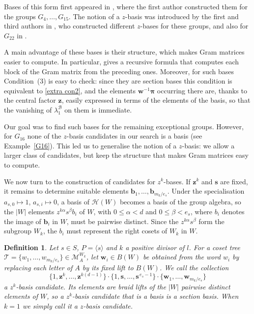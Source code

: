 \documentclass[11pt, reqno]{amsart}
\newcommand{\cB}{\mathcal{B}}
\newcommand{\cH}{\mathcal{H}}
\numberwithin{equation}{section}
\newtheorem{definition}[theorem]{Definition}
\theoremstyle{remark}
\begin{document}
	
	
	

Bases of this form first appeared in \cite{Ch17}, where the first author constructed
them for the groups $G_4,\dots,G_{15}$. The notion of a $z$-basis was introduced by the first and third
authors in \cite[Definition~2.4]{ChPf}, who constructed different $z$-bases for these
groups, and also for $G_{22}$ in
\cite{ChPf1}.

 A main advantage of these bases is their structure, which
	makes Gram matrices easier to compute. In particular,
	\cite[Lemma~3.2]{ChPf} gives a recursive formula that computes each
	block of the Gram matrix from the preceding ones. Moreover, for such bases Condition~(3) is easy to check: since they are section bases this condition is
	equivalent to \eqref{extra con2}, and the elements $\mathbf w^{-1}\boldsymbol\pi$
	occurring there are, thanks to the central factor $\mathbf z$, easily expressed in terms of
	the elements of the basis, so that the vanishing of $\lambda_1^{\cB}$ on them is immediate.
	
	Our goal was to find such bases for the remaining exceptional groups.
	However, for $G_{16}$ none of the $z$-basis candidates in our search
	is a basis (see Example~\ref{G16}). This led us to generalise the
	notion of a $z$-basis: we allow a larger class of candidates, but keep
	the structure that makes Gram matrices easy to compute.
	



We now turn to the construction of candidates for $z^k$-bases. If $\mathbf z^k$ and $\mathbf s$ are fixed, it remains to determine suitable elements $\mathbf b_1,\ldots,\mathbf b_{m_k/e_s}$. Under the specialisation $a_{s,0}\mapsto1$, $a_{s,i}\mapsto0$, a basis of $\cH(W)$ becomes a basis of the group algebra, so the $|W|$ elements $z^{k\alpha}s^{\beta}b_i$ of $W$, with $0\le\alpha<d$ and $0\le\beta<e_s$, where $b_i$ denotes the image of $\mathbf b_i$ in $W$, must be pairwise distinct. Since the $z^{k\alpha}s^{\beta}$ form the subgroup $W_k$, the $b_i$ must represent the right cosets of $W_k$ in $W$.

















\begin{definition}\label{def:zkcandidate}{\rm
	Let $s\in S$, $P=\langle s\rangle$ and $k$ a positive divisor of $l$. For a coset tree
	$\mathcal T=\{w_1,\ldots,w_{m_k/e_s}\}\in\mathcal M_A^{W_k}$, let
	$\mathbf w_i\in B(W)$ be obtained from the word $w_i$ by replacing
	each letter of $A$ by its fixed lift to $B(W)$. We call the
	collection
	\[
	\{1,\mathbf z^{k},\ldots,\mathbf z^{k(d-1)}\}
	\cdot
	\{1,\mathbf s,\ldots,\mathbf s^{\,e_s-1}\}
	\cdot
	\{\mathbf w_1,\ldots,\mathbf w_{m_k/e_s}\}
	\]
	a \emph{$z^k$-basis candidate}. Its elements are braid lifts of the $|W|$ pairwise distinct elements of
$W$, so a $z^k$-basis candidate that is a basis is a section basis. When $k=1$ we simply call it a
	\emph{$z$-basis candidate}.}
\end{definition}
\end{document}
